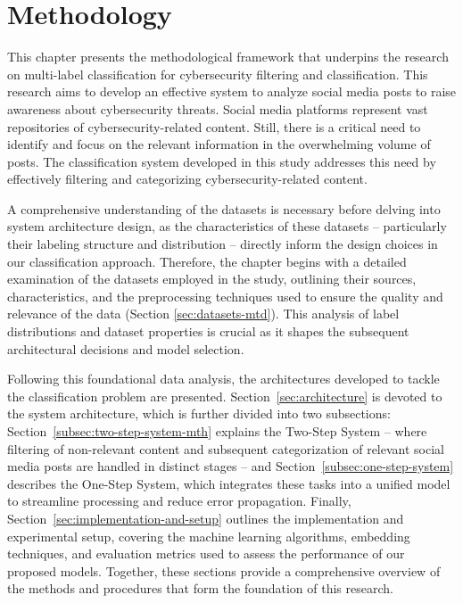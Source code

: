 \chapter{Methodology}\label{ch:methodology}
This chapter presents the methodological framework that underpins the research on multi-label classification for cybersecurity filtering and classification. This research aims to develop an effective system to analyze social media posts to raise awareness about cybersecurity threats. Social media platforms represent vast repositories of cybersecurity-related content. Still, there is a critical need to identify and focus on the relevant information in the overwhelming volume of posts. The classification system developed in this study addresses this need by effectively filtering and categorizing cybersecurity-related content.

A comprehensive understanding of the datasets is necessary before delving into system architecture design, as the characteristics of these datasets -- particularly their labeling structure and distribution -- directly inform the design choices in our classification approach. Therefore, the chapter begins with a detailed examination of the datasets employed in the study, outlining their sources, characteristics, and the preprocessing techniques used to ensure the quality and relevance of the data (Section \ref{sec:datasets-mtd}). This analysis of label distributions and dataset properties is crucial as it shapes the subsequent architectural decisions and model selection.

Following this foundational data analysis, the architectures developed to tackle the classification problem are presented. Section~\ref{sec:architecture} is devoted to the system architecture, which is further divided into two subsections: Section~\ref{subsec:two-step-system-mth} explains the Two-Step System -- where filtering of non-relevant content and subsequent categorization of relevant social media posts are handled in distinct stages -- and Section~\ref{subsec:one-step-system} describes the One-Step System, which integrates these tasks into a unified model to streamline processing and reduce error propagation. Finally, Section~\ref{sec:implementation-and-setup} outlines the implementation and experimental setup, covering the machine learning algorithms, embedding techniques, and evaluation metrics used to assess the performance of our proposed models. Together, these sections provide a comprehensive overview of the methods and procedures that form the foundation of this research.

